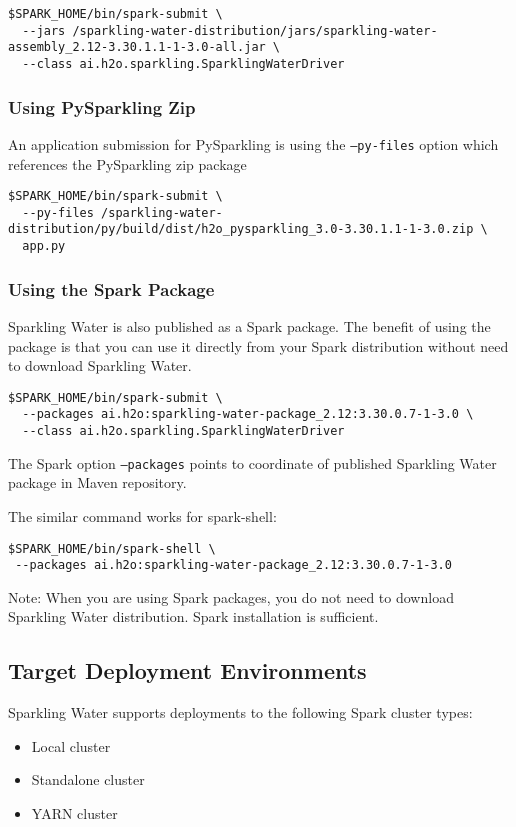\pagebreak
\begin{lstlisting}[style=Bash]
$SPARK_HOME/bin/spark-submit \
  --jars /sparkling-water-distribution/jars/sparkling-water-assembly_2.12-3.30.1.1-1-3.0-all.jar \
  --class ai.h2o.sparkling.SparklingWaterDriver
\end{lstlisting}

\subsubsection{Using PySparkling Zip}
An application submission for PySparkling is using the \texttt{--py-files} option which references the PySparkling
zip package

\begin{lstlisting}[style=Bash]
$SPARK_HOME/bin/spark-submit \
  --py-files /sparkling-water-distribution/py/build/dist/h2o_pysparkling_3.0-3.30.1.1-1-3.0.zip \
  app.py
\end{lstlisting}

\subsubsection{Using the Spark Package}

Sparkling Water is also published as a Spark package. The benefit of using the package is that you can use it directly
from your Spark distribution without need to download Sparkling Water.

\begin{lstlisting}[style=Bash]
$SPARK_HOME/bin/spark-submit \
  --packages ai.h2o:sparkling-water-package_2.12:3.30.0.7-1-3.0 \
  --class ai.h2o.sparkling.SparklingWaterDriver
\end{lstlisting}

The Spark option \texttt{--packages} points to coordinate of published Sparkling Water package in Maven repository.

The similar command works for spark-shell:

\begin{lstlisting}[style=Bash]
$SPARK_HOME/bin/spark-shell \
 --packages ai.h2o:sparkling-water-package_2.12:3.30.0.7-1-3.0
\end{lstlisting}

Note: When you are using Spark packages, you do not need to download Sparkling Water distribution. Spark installation is sufficient.

\subsection{Target Deployment Environments}
Sparkling Water supports deployments to the following Spark cluster types:
\begin{itemize}
	\item{Local cluster}
	\item{Standalone cluster} 
	\item{YARN cluster}
\end{itemize}

